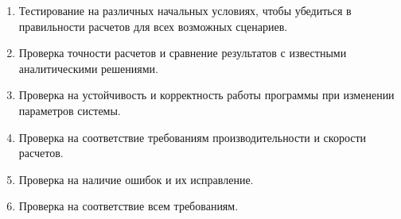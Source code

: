  \hspace{0pt}\newline
 \begin{enumerate}
  \item Тестирование на различных начальных условиях, чтобы убедиться в правильности расчетов для всех возможных сценариев.
  \item Проверка точности расчетов и сравнение результатов с известными аналитическими решениями.
  \item Проверка на устойчивость и корректность работы программы при изменении параметров системы.
  \item Проверка на соответствие требованиям производительности и скорости расчетов.
  \item Проверка на наличие ошибок и их исправление.
  \item Проверка на соответствие всем требованиям.
 \end{enumerate}


